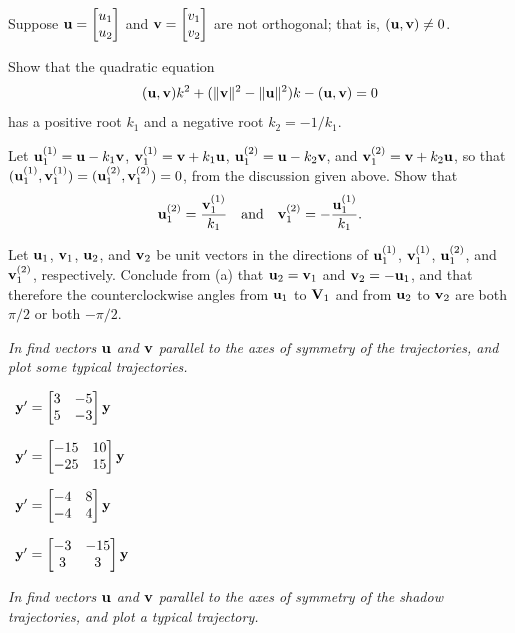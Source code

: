 \begin{exerciselist}
\item\label{exer:10.6.28}Suppose $\mathbf{u}=\begin{bmatrix}u_1\\u_2\end{bmatrix}$ and $\mathbf{v}=\begin{bmatrix}v_1\\v_2\end{bmatrix}$ are not orthogonal; that is, $(\mathbf{u},\mathbf{v})\ne0$.
\begin{alist}
\item %
Show that  the quadratic equation
\[
(\mathbf{u},\mathbf{v})k^2+(\|\mathbf{v}\|^2-\|\mathbf{u}\|^2)k-(\mathbf{u},\mathbf{v})=0
\]
has a positive root $k_1$ and a negative root $k_2=-1/k_1$.
\item %
Let $\mathbf{u}_1^{(1)}=\mathbf{u}-k_1\mathbf{v}$, $\mathbf{v}_1^{(1)}=\mathbf{v}+k_1\mathbf{u}$, $\mathbf{u}_1^{(2)}=\mathbf{u}-k_2\mathbf{v}$, and $\mathbf{v}_1^{(2)}=\mathbf{v}+k_2\mathbf{u}$, so that $(\mathbf{u}_1^{(1)},\mathbf{v}_1^{(1)}) =(\mathbf{u}_1^{(2)},\mathbf{v}_1^{(2)})=0$, from the discussion
given above. Show that
\[
\mathbf{u}_1^{(2)}=\frac{\mathbf{v}_1^{(1)}}{k_1}
\quad\text{and}\quad 
\mathbf{v}_1^{(2)}=-\frac{\mathbf{u}_1^{(1)}}{k_1}.
\]
\item %
Let $\mathbf{u}_1$, $\mathbf{v}_1$, $\mathbf{u}_2$, and $\mathbf{v}_2$ be unit
vectors in the directions of $\mathbf{u}_1^{(1)}$, $\mathbf{v}_1^{(1)}$,
$\mathbf{u}_1^{(2)}$, and $\mathbf{v}_1^{(2)}$, respectively. Conclude from
(a) that $\mathbf{u}_2=\mathbf{v}_1$ and $\mathbf{v}_2=-\mathbf{u}_1$, and
that therefore the counterclockwise angles from $\mathbf{u}_1$ to $\mathbf{V}_1$ and from $\mathbf{u}_2$ to $\mathbf{v}_2$ are both $\pi/2$ or both
$-\pi/2$.
\end{alist}
\end{exerciselist}
%
\textsl{In  find vectors
$\mathbf{u}$ and $\mathbf{v}$ parallel to the axes of symmetry of the
trajectories, and plot some typical trajectories.}
\begin{exerciselistTwoColumn}
\item\label{exer:10.6.29}\CGex\, $\mathbf{y}'=\begin{bmatrix}3&-5\\5&-3\end{bmatrix}\mathbf{y}$
\item\label{exer:10.6.30}\CGex\,  $\mathbf{y}'=\begin{bmatrix}-15&10\\-25&15\end{bmatrix}\mathbf{y}$
\item\label{exer:10.6.31}\CGex\,  $\mathbf{y}'=\begin{bmatrix}-4&8\\-4&4\end{bmatrix}\mathbf{y}$
\item\label{exer:10.6.32}\CGex\,  $\mathbf{y}'=\begin{bmatrix}-3&-15\\3&3\end{bmatrix}\mathbf{y}$
\end{exerciselistTwoColumn}
%
\textsl{In  find vectors
$\mathbf{u}$ and $\mathbf{v}$ parallel to the axes of symmetry of the shadow
trajectories, and plot a typical trajectory.}
